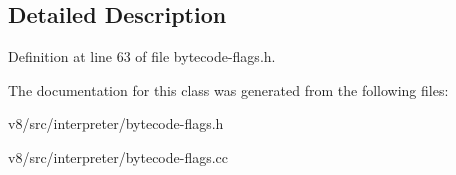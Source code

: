 \subsection{Detailed Description}


Definition at line 63 of file bytecode-\/flags.\+h.



The documentation for this class was generated from the following files\+:\begin{DoxyCompactItemize}
\item 
v8/src/interpreter/bytecode-\/flags.\+h\item 
v8/src/interpreter/bytecode-\/flags.\+cc\end{DoxyCompactItemize}
